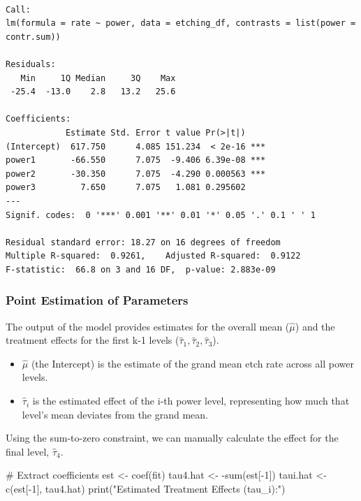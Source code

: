 \documentclass[
  letterpaper,
  DIV=11,
  numbers=noendperiod]{scrreprt}
\newenvironment{Shaded}{\begin{snugshade}}{\end{snugshade}}
\newcommand{\CommentTok}[1]{\textcolor[rgb]{0.37,0.37,0.37}{#1}}
\newcommand{\DecValTok}[1]{\textcolor[rgb]{0.68,0.00,0.00}{#1}}
\newcommand{\FunctionTok}[1]{\textcolor[rgb]{0.28,0.35,0.67}{#1}}
\newcommand{\NormalTok}[1]{\textcolor[rgb]{0.00,0.23,0.31}{#1}}
\newcommand{\OtherTok}[1]{\textcolor[rgb]{0.00,0.23,0.31}{#1}}
\newcommand{\SpecialCharTok}[1]{\textcolor[rgb]{0.37,0.37,0.37}{#1}}
\newcommand{\StringTok}[1]{\textcolor[rgb]{0.13,0.47,0.30}{#1}}
\providecommand{\tightlist}{%
  \setlength{\itemsep}{0pt}\setlength{\parskip}{0pt}}\usepackage{longtable,booktabs,array}
\begin{document}
\begin{verbatim}

Call:
lm(formula = rate ~ power, data = etching_df, contrasts = list(power = contr.sum))

Residuals:
   Min     1Q Median     3Q    Max 
 -25.4  -13.0    2.8   13.2   25.6 

Coefficients:
            Estimate Std. Error t value Pr(>|t|)    
(Intercept)  617.750      4.085 151.234  < 2e-16 ***
power1       -66.550      7.075  -9.406 6.39e-08 ***
power2       -30.350      7.075  -4.290 0.000563 ***
power3         7.650      7.075   1.081 0.295602    
---
Signif. codes:  0 '***' 0.001 '**' 0.01 '*' 0.05 '.' 0.1 ' ' 1

Residual standard error: 18.27 on 16 degrees of freedom
Multiple R-squared:  0.9261,    Adjusted R-squared:  0.9122 
F-statistic:  66.8 on 3 and 16 DF,  p-value: 2.883e-09
\end{verbatim}

\subsubsection{Point Estimation of
Parameters}\label{point-estimation-of-parameters}

The output of the model provides estimates for the overall mean
(\(\hat{\mu}\)) and the treatment effects for the first k-1 levels
(\(\hat{\tau}_1, \hat{\tau}_2, \hat{\tau}_3\)).

\begin{itemize}
\tightlist
\item
  \(\hat{\mu}\) (the Intercept) is the estimate of the grand mean etch
  rate across all power levels.
\item
  \(\hat{\tau}_i\) is the estimated effect of the i-th power level,
  representing how much that level's mean deviates from the grand mean.
\end{itemize}

Using the sum-to-zero constraint, we can manually calculate the effect
for the final level, \(\hat{\tau}_4\).

\begin{Shaded}
\begin{Highlighting}[]
\CommentTok{\# Extract coefficients}
\NormalTok{est }\OtherTok{\textless{}{-}} \FunctionTok{coef}\NormalTok{(fit)}
\NormalTok{tau4.hat }\OtherTok{\textless{}{-}} \SpecialCharTok{{-}}\FunctionTok{sum}\NormalTok{(est[}\SpecialCharTok{{-}}\DecValTok{1}\NormalTok{])}
\NormalTok{taui.hat }\OtherTok{\textless{}{-}} \FunctionTok{c}\NormalTok{(est[}\SpecialCharTok{{-}}\DecValTok{1}\NormalTok{], tau4.hat)}
\FunctionTok{print}\NormalTok{(}\StringTok{"Estimated Treatment Effects (tau\_i):"}\NormalTok{)}
\end{Highlighting}
\end{Shaded}
\end{document}
